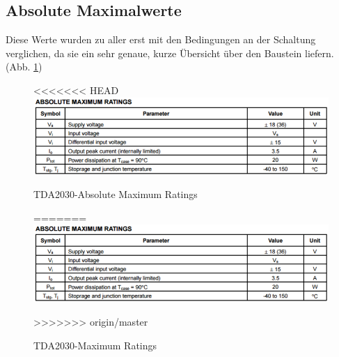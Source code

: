 \subsection{Absolute Maximalwerte}\label{subsec:3.2.1}
Diese Werte wurden zu aller erst mit den Bedingungen an der Schaltung verglichen, da sie ein sehr genaue, kurze Übersicht über den Baustein liefern. (Abb. \ref{fig:3.2.1.1})
\begin{figure} [H]
	\centering
<<<<<<< HEAD
	\includegraphics[width=1\textwidth]{img/Print5/TDA2030MaximumRatings.PNG}
	\caption{TDA2030-Absolute Maximum Ratings}
=======
	\includegraphics[width=1\textwidth]{img/Grundlagen/TDA2030/TDA2030MaximumRatings.PNG}
	\caption{TDA2030-Maximum Ratings}
>>>>>>> origin/master
	\label {fig:3.2.1.1}
\end{figure}


